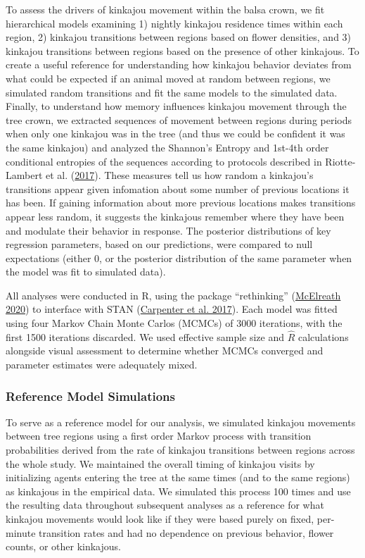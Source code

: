 \documentclass[twoside,12pt,final]{ucthesis-CA2012}
\begin{document}
\begin{ucmainmatter}
To assess the drivers of kinkajou movement within the balsa crown, we fit hierarchical models examining 1) nightly kinkajou residence times within each region, 2) kinkajou transitions between regions based on flower densities, and 3) kinkajou transitions between regions based on the presence of other kinkajous. To create a useful reference for understanding how kinkajou behavior deviates from what could be expected if an animal moved at random between regions, we simulated random transitions and fit the same models to the simulated data. Finally, to understand how memory influences kinkajou movement through the tree crown, we extracted sequences of movement between regions during periods when only one kinkajou was in the tree (and thus we could be confident it was the same kinkajou) and analyzed the Shannon's Entropy and 1st-4th order conditional entropies of the sequences according to protocols described in Riotte-Lambert et al. (\protect\hyperlink{ref-riotte-lambert2017}{2017}). These measures tell us how random a kinkajou's transitions appear given infomation about some number of previous locations it has been. If gaining information about more previous locations makes transitions appear less random, it suggests the kinkajous remember where they have been and modulate their behavior in response. The posterior distributions of key regression parameters, based on our predictions, were compared to null expectations (either 0, or the posterior distribution of the same parameter when the model was fit to simulated data).

All analyses were conducted in R, using the package ``rethinking'' (\protect\hyperlink{ref-mcelreath2020}{McElreath 2020}) to interface with STAN (\protect\hyperlink{ref-carpenter2017stan}{Carpenter et al. 2017}). Each model was fitted using four Markov Chain Monte Carlos (MCMCs) of 3000 iterations, with the first 1500 iterations discarded. We used effective sample size and \(\hat{R}\) calculations alongside visual assessment to determine whether MCMCs converged and parameter estimates were adequately mixed.

\hypertarget{reference-model-simulations}{%
\subsubsection{Reference Model Simulations}\label{reference-model-simulations}}

To serve as a reference model for our analysis, we simulated kinkajou movements between tree regions using a first order Markov process with transition probabilities derived from the rate of kinkajou transitions between regions across the whole study. We maintained the overall timing of kinkajou visits by initializing agents entering the tree at the same times (and to the same regions) as kinkajous in the empirical data. We simulated this process 100 times and use the resulting data throughout subsequent analyses as a reference for what kinkajou movements would look like if they were based purely on fixed, per-minute transition rates and had no dependence on previous behavior, flower counts, or other kinkajous.


\end{ucmainmatter}
\end{document}
